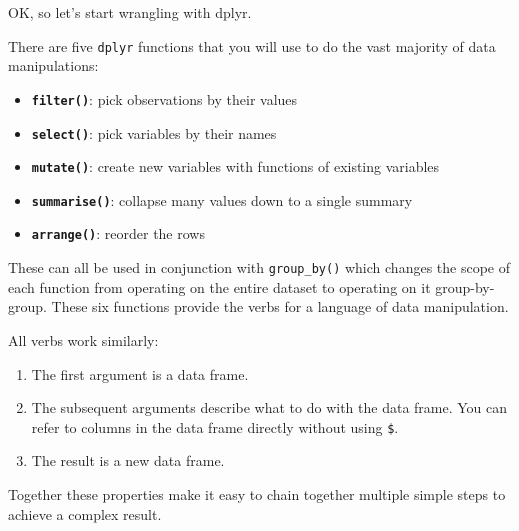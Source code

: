 \documentclass[]{book}
\providecommand{\tightlist}{%
  \setlength{\itemsep}{0pt}\setlength{\parskip}{0pt}}
\theoremstyle{definition}
\theoremstyle{definition}
\theoremstyle{definition}
\theoremstyle{remark}
\begin{document}
OK, so let's start wrangling with dplyr.

There are five \texttt{dplyr} functions that you will use to do the vast
majority of data manipulations:

\begin{itemize}
\tightlist
\item
  \textbf{\texttt{filter()}}: pick observations by their values
\end{itemize}

\begin{itemize}
\tightlist
\item
  \textbf{\texttt{select()}}: pick variables by their names
\end{itemize}

\begin{itemize}
\tightlist
\item
  \textbf{\texttt{mutate()}}: create new variables with functions of
  existing variables
\end{itemize}

\begin{itemize}
\tightlist
\item
  \textbf{\texttt{summarise()}}: collapse many values down to a single
  summary
\end{itemize}

\begin{itemize}
\tightlist
\item
  \textbf{\texttt{arrange()}}: reorder the rows
\end{itemize}

These can all be used in conjunction with \texttt{group\_by()} which
changes the scope of each function from operating on the entire dataset
to operating on it group-by-group. These six functions provide the verbs
for a language of data manipulation.

All verbs work similarly:

\begin{enumerate}
\def\labelenumi{\arabic{enumi}.}
\tightlist
\item
  The first argument is a data frame.
\item
  The subsequent arguments describe what to do with the data frame. You
  can refer to columns in the data frame directly without using
  \texttt{\$}.
\item
  The result is a new data frame.
\end{enumerate}

Together these properties make it easy to chain together multiple simple
steps to achieve a complex result.
\end{document}
